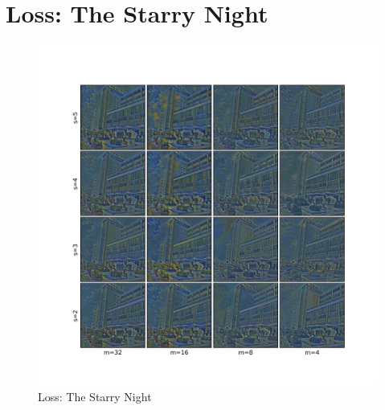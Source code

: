 \section{Loss: The Starry Night}
\begin{figure}[H]
	\centering
	\includegraphics[width=1.00\textwidth]{resources/content/experiments/fast_image_grid_experiment1.jpg}
	\caption{Loss: The Starry Night}
	\label{img:loss_the_starry_night}
\end{figure}


